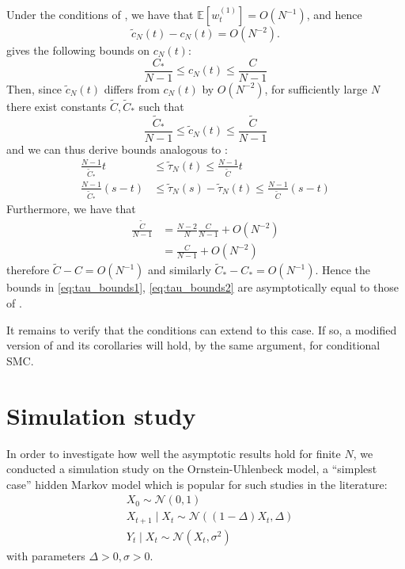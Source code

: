 \documentclass{article}
\newcommand{\E}{\mathbb{E}}
\newcommand{\wt}[2][t]{w_{#1}^{(#2)}}
\newcommand{\N}{\mathcal{N}}
\begin{document}
Under the conditions of \citet[Corollary 2]{koskela2018}, we have that $\E[\wt{1}] = O(N^{-1})$, and hence
\begin{equation*}
\tilde{c}_N(t) - c_N(t) = O(N^{-2}).
\end{equation*}
\citet{koskela2018} gives the following bounds on $c_N(t)$:
\begin{equation*}
\frac{C_*}{N-1} \leq c_N(t) \leq \frac{C}{N-1}
\end{equation*}
Then, since $\tilde{c}_N(t)$ differs from $c_N(t)$ by $O(N^{-2})$, for sufficiently large $N$ there exist constants $\tilde{C}, \tilde{C}_*$ such that
\begin{equation*}
\frac{\tilde{C}_*}{N-1} \leq \tilde{c}_N(t) \leq \frac{\tilde{C}}{N-1}
\end{equation*}
and we can thus derive bounds analogous to \citet[(5)-(6)]{koskela2018}:
\begin{align}
\frac{N-1}{\tilde{C}_*}t &\leq \tilde{\tau}_N(t) \leq \frac{N-1}{\tilde{C}}t \label{eq:tau_bounds1}\\
\frac{N-1}{\tilde{C}_*}(s-t) &\leq \tilde{\tau}_N(s) - \tilde{\tau}_N(t) \leq \frac{N-1}{\tilde{C}}(s-t) \label{eq:tau_bounds2}
\end{align}
Furthermore, we have that
\begin{align*}
\frac{\tilde{C}}{N-1} &= \frac{N-2}{N} \frac{C}{N-1} + O(N^{-2}) \\
&= \frac{C}{N-1} + O(N^{-2})
\end{align*}
therefore $\tilde{C} - C = O(N^{-1})$ and similarly $\tilde{C}_* - C_* = O(N^{-1})$. Hence the bounds in \eqref{eq:tau_bounds1}, \eqref{eq:tau_bounds2} are asymptotically equal to those of \citet[(5)--(6)]{koskela2018}.

It remains to verify that the conditions \citep[(3)--(4)]{koskela2018} can extend to this case. If so, a modified version of \citet[Theorem 1]{koskela2018} and its corollaries will hold, by the same argument, for conditional SMC.

\section{Simulation study}
In order to investigate how well the asymptotic results hold for finite $N$, we conducted a simulation study on the Ornstein-Uhlenbeck model, a ``simplest case'' hidden Markov model which is popular for such studies in the literature:
\begin{align*}
& X_0 \sim \N(0,1) \\
& X_{t+1} \mid X_t \sim \N((1-\Delta)X_t, \Delta) \\
& Y_t \mid X_{t} \sim \N(X_t, \sigma^2)
\end{align*}
with parameters $\Delta >0, \sigma >0$.
\end{document}
